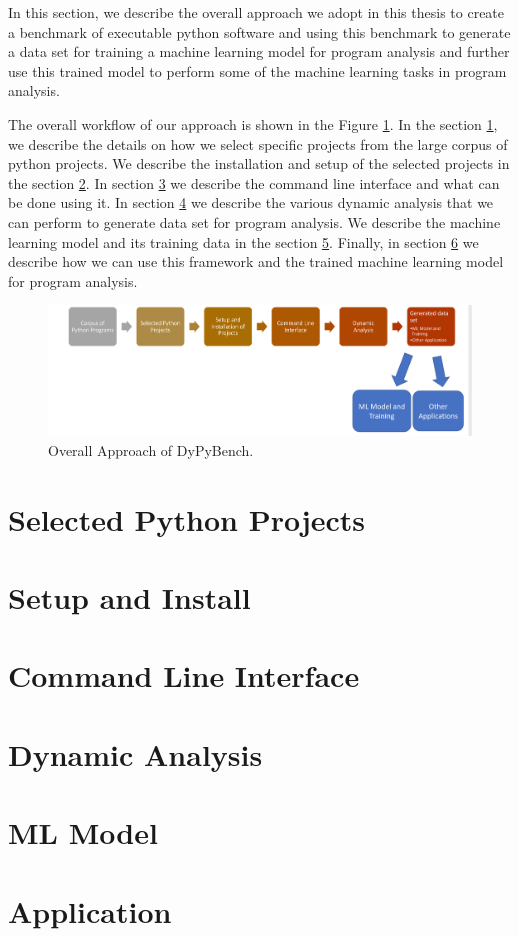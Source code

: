 In this section, we describe the overall approach we adopt in this thesis to create a benchmark of executable python software and using this benchmark to generate a data set for training a machine learning model for program analysis and further use this trained model to perform some of the machine learning tasks in program analysis.

The overall workflow of our approach is shown in the Figure \ref{fig:overall_approach}. In the section \ref{approach:selection of projects}, we describe the details on how we select specific projects from the large corpus of python projects. We describe the installation and setup of the selected projects in the section \ref{approach:setup and install}. In section \ref{approach:command line interface} we describe the command line interface and what can be done using it. In section \ref{approach:dynamic analysis} we describe the various dynamic analysis that we can perform to generate data set for program analysis. We describe the machine learning model and its training data in the section \ref{approach:ml model}. Finally, in section \ref{approach:application} we describe how we can use this framework and the trained machine learning model for program analysis.

\begin{figure}[ht]
\centering
\includegraphics[width=1\linewidth]{figures/approach/Approach2.png}
\caption[Approach]{\label{fig:overall_approach}Overall Approach of DyPyBench.}
\end{figure}

\section{Selected Python Projects}
\label{approach:selection of projects}

\section{Setup and Install}
\label{approach:setup and install}

\section{Command Line Interface}
\label{approach:command line interface}

\section{Dynamic Analysis}
\label{approach:dynamic analysis}

\section{ML Model}
\label{approach:ml model}

\section{Application}
\label{approach:application}